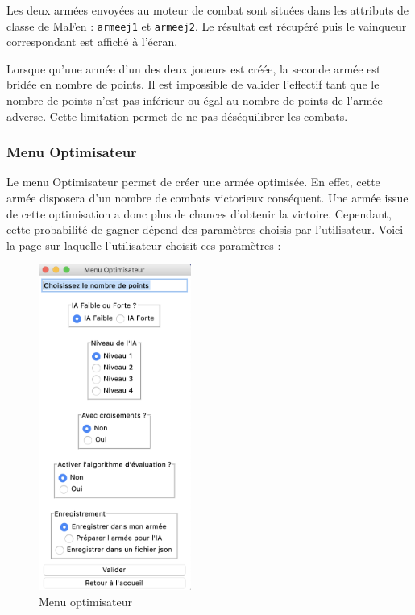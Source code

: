 \documentclass[a4paper]{article} %
\begin{document}
Les deux armées envoyées au moteur de combat sont situées dans les attributs de classe de MaFen : \texttt{armeej1} et \texttt{armeej2}. Le résultat est récupéré puis le vainqueur correspondant est affiché à l'écran.

Lorsque qu'une armée d'un des deux joueurs est créée, la seconde armée est bridée en nombre de points. Il est impossible de valider l'effectif tant que le nombre de points n'est pas inférieur ou égal au nombre de points de l'armée adverse. Cette limitation permet de ne pas déséquilibrer les combats.

		\subsubsection{Menu Optimisateur}
Le menu Optimisateur permet de créer une armée optimisée. En effet, cette armée disposera d'un nombre de combats victorieux conséquent. Une armée issue de cette optimisation a donc plus de chances d'obtenir la victoire. Cependant, cette probabilité de gagner dépend des paramètres choisis par l'utilisateur. Voici la page sur laquelle l'utilisateur choisit ces paramètres :

\begin{figure}[!h]
	\begin{center}
	\includegraphics[width=5cm]{Images/menuOptimisateur.png}
	\caption{Menu optimisateur\label{fig:MenuOptimisateur}}
	\end{center}
\end{figure}
\end{document}
